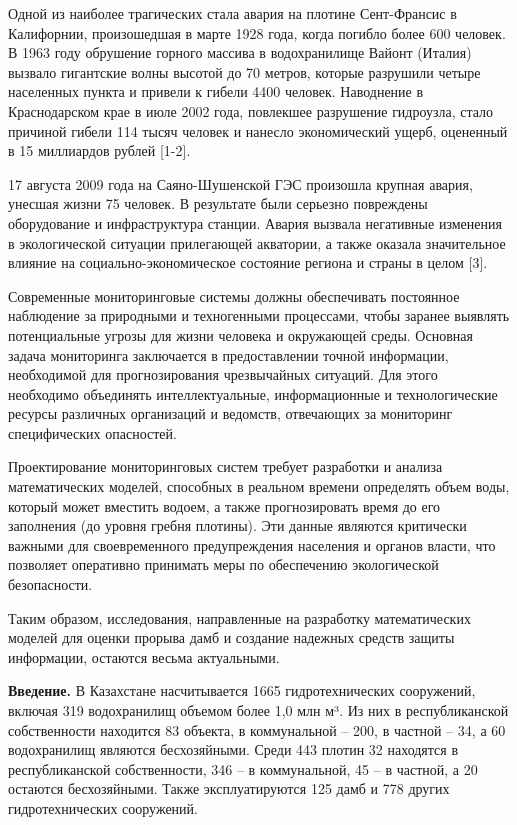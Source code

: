 \documentclass[
]{article}
\begin{document}
Одной из наиболее трагических стала авария на плотине Сент-Франсис в
Калифорнии, произошедшая в марте 1928 года, когда погибло более 600
человек. В 1963 году обрушение горного массива в водохранилище Вайонт
(Италия) вызвало гигантские волны высотой до 70 метров, которые
разрушили четыре населенных пункта и привели к гибели 4400 человек.
Наводнение в Краснодарском крае в июле 2002 года, повлекшее разрушение
гидроузла, стало причиной гибели 114 тысяч человек и нанесло
экономический ущерб, оцененный в 15 миллиардов рублей {[}1-2{]}.

17 августа 2009 года на Саяно-Шушенской ГЭС произошла крупная авария,
унесшая жизни 75 человек. В результате были серьезно повреждены
оборудование и инфраструктура станции. Авария вызвала негативные
изменения в экологической ситуации прилегающей акватории, а также
оказала значительное влияние на социально-экономическое состояние
региона и страны в целом {[}3{]}.

Современные мониторинговые системы должны обеспечивать постоянное
наблюдение за природными и техногенными процессами, чтобы заранее
выявлять потенциальные угрозы для жизни человека и окружающей среды.
Основная задача мониторинга заключается в предоставлении точной
информации, необходимой для прогнозирования чрезвычайных ситуаций. Для
этого необходимо объединять интеллектуальные, информационные и
технологические ресурсы различных организаций и ведомств, отвечающих за
мониторинг специфических опасностей.

Проектирование мониторинговых систем требует разработки и анализа
математических моделей, способных в реальном времени определять объем
воды, который может вместить водоем, а также прогнозировать время до его
заполнения (до уровня гребня плотины). Эти данные являются критически
важными для своевременного предупреждения населения и органов власти,
что позволяет оперативно принимать меры по обеспечению экологической
безопасности.

Таким образом, исследования, направленные на разработку математических
моделей для оценки прорыва дамб и создание надежных средств защиты
информации, остаются весьма актуальными.

\textbf{Введение.} В Казахстане насчитывается 1665 гидротехнических
сооружений, включая 319 водохранилищ объемом более 1,0 млн м³. Из них в
республиканской собственности находится 83 объекта, в коммунальной --
200, в частной -- 34, а 60 водохранилищ являются бесхозяйными. Среди 443
плотин 32 находятся в республиканской собственности, 346 -- в
коммунальной, 45 -- в частной, а 20 остаются бесхозяйными. Также
эксплуатируются 125 дамб и 778 других гидротехнических сооружений.
\end{document}
